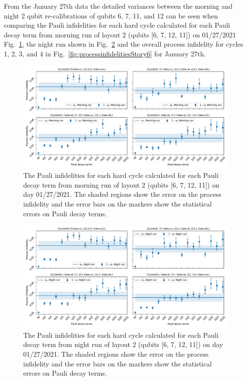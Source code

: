 From the January 27th data the detailed variances between the morning and night 2 qubit re-calibrations of qubits 6, 7, 11, and 12 can be seen when comparing the Pauli infidelities for each hard cycle calculated for each Pauli decay term from morning run of layout 2 (qubits [6, 7, 12, 11]) on 01/27/2021 
Fig.~\ref{fig:PauliInfidelities27Morning_Story6}, 
the night run shown in Fig.~\ref{fig:PauliInfidelities27Night_Story6} 
and the overall process infidelity for cycles 1, 2, 3, and 4 in Fig.~\ref{fig:processinfidelitiesStory6} for January 27th.

\begin{figure}[ht!]
    \includegraphics[scale=0.56]{CBPauliInfidelities_27_01_2021_MorningRun_Layout2_Cycle1_2_3_4.pdf}
    \caption{The Pauli infidelities for each hard cycle calculated for each Pauli decay term from morning run of layout 2 (qubits [6, 7, 12, 11]) on day 01/27/2021. The shaded regions show the error on the process infidelity and the error bars on the markers show the statistical errors on Pauli decay terms. }
    \label{fig:PauliInfidelities27Morning_Story6}
\end{figure}


\begin{figure}[ht!]
    \includegraphics[scale=0.56]{CBPauliInfidelities_27_01_2021_NightRun_Layout2_Cycle1_2_3_4.pdf}
    \caption{The Pauli infidelities for each hard cycle calculated for each Pauli decay term from night run of layout 2 (qubits [6, 7, 12, 11]) on day 01/27/2021. The shaded regions show the error on the process infidelity and the error bars on the markers show the statistical errors on Pauli decay terms. }
    \label{fig:PauliInfidelities27Night_Story6}
\end{figure}
 
